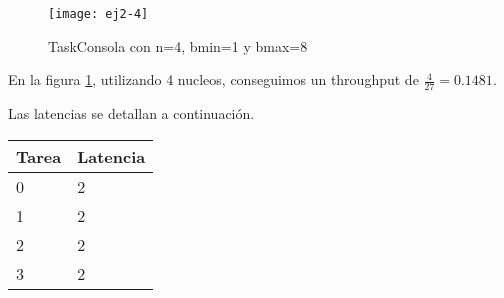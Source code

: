 \begin{figure}[H]
    \centering
    \texttt{[image: ej2-4]}
    \caption{TaskConsola con n=4, bmin=1 y bmax=8}
    \label{fig:ej2.4}
\end{figure}

En la figura \ref{fig:ej2.4}, utilizando 4 nucleos, conseguimos un throughput de $\frac{4}{27} = 0.1481$.

Las latencias se detallan a continuación.

\begin{center}
    \begin{tabular}{| l | l |}
        \hline
        Tarea & Latencia \\ \hline
        0 & 2 \\
        1 & 2 \\
        2 & 2 \\
        3 & 2 \\
        \hline
    \end{tabular}
\end{center}
